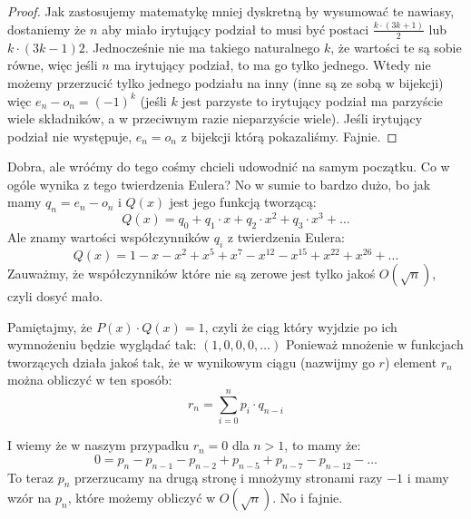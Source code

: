 \begin{proof}
	Jak zastosujemy matematykę mniej dyskretną by wysumować te nawiasy, dostaniemy że \(n\) aby miało irytujący podział to musi być postaci \(\frac{k \cdot (3k+1)}{2}\) lub \({k \cdot (3k-1)}{2}\). Jednocześnie nie ma takiego naturalnego \(k\), że wartości te są sobie równe, więc jeśli \(n\) ma irytujący podział, to ma go tylko jednego. Wtedy nie możemy przerzucić tylko jednego podziału na inny (inne są ze sobą w bijekcji) więc \(e_n - o_n = (-1)^k\) (jeśli \(k\) jest parzyste to irytujący podział ma parzyście wiele składników, a w przeciwnym razie nieparzyście wiele). Jeśli irytujący podział nie występuje, \(e_n = o_n\) z bijekcji którą pokazaliśmy. Fajnie.
\end{proof}

Dobra, ale wróćmy do tego cośmy chcieli udowodnić na samym początku. Co w ogóle wynika z tego twierdzenia Eulera? No w sumie to bardzo dużo, bo jak mamy \(q_n = e_n - o_n\) i \(Q(x)\) jest jego funkcją tworzącą:
\begin{equation*}
	Q(x) = q_0 + q_1 \cdot x + q_2 \cdot x^2 + q_3 \cdot x^3 + \dots
\end{equation*}
Ale znamy wartości współczynników \(q_i\) z twierdzenia Eulera:
\begin{equation*}
	Q(x) = 1 - x - x^2 + x^5 + x^7 - x^{12} - x^{15} + x^{22} + x^{26} + \dots
\end{equation*}
Zauważmy, że współczynników które nie są zerowe jest tylko jakoś \(O(\sqrt{n})\), czyli dosyć mało.

Pamiętajmy, że \(P(x) \cdot Q(x) = 1\), czyli że ciąg który wyjdzie po ich wymnożeniu będzie wyglądać tak: \((1,0,0,0, \dots)\) Ponieważ mnożenie w funkcjach tworzących działa jakoś tak, że w wynikowym ciągu (nazwijmy go \(r\)) element \(r_n\) można obliczyć w ten sposób:
\begin{equation*}
	r_n = \sum_{i=0}^{n} p_i \cdot q_{n-i}
\end{equation*}

I wiemy że w naszym przypadku \(r_n = 0\) dla \(n > 1\), to mamy że: \begin{equation*}
	0 = p_n - p_{n-1} - p_{n-2} + p_{n-5} + p_{n-7} - p_{n-12} - \dots
\end{equation*}
To teraz \(p_n\) przerzucamy na drugą stronę i mnożymy stronami razy \(-1\) i mamy wzór na \(p_n\), które możemy obliczyć w \(O(\sqrt{n})\). No i fajnie.
